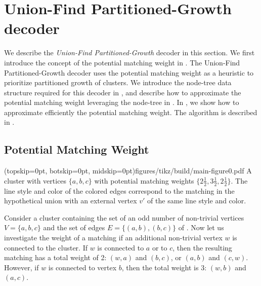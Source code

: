 \section{Union-Find Partitioned-Growth decoder}\label{sec:ufbb}
We describe the \emph{Union-Find Partitioned-Growth} decoder in this section. We first introduce the concept of the potential matching weight in . The Union-Find Partitioned-Growth decoder uses the potential matching weight as a heuristic to prioritize partitioned growth of clusters. We introduce the node-tree data structure required for this decoder in , and describe how to approximate the potential matching weight leveraging the node-tree in . In , we show how to approximate efficiently the potential matching weight. The algorithm is described in . 

\subsection{Potential Matching Weight}\label{sec:matchingweight}

\Figure[bt](topskip=0pt, botskip=0pt, midskip=0pt){figures/tikz/build/main-figure0.pdf}{
    A cluster with vertices $\{a,b,c\}$ with potential matching weights $\{2\frac{1}{2}, 3\frac{1}{2}, 2\frac{1}{2}\}$. The line style and color of the colored edges correspond to the matching in the hypothetical union with an external vertex $v'$ of the same line style and color.\label{fig0}}


Consider a cluster containing the set of an odd number of non-trivial vertices $V=\{a,b,c\}$ and the set of edges $E=\{(a,b), (b, c)\}$ of . Now let us investigate the weight of a matching if an additional non-trivial vertex $w$ is connected to the cluster. If $w$ is connected to $a$ or to $c$, then the resulting matching has a total weight of 2: $(w,a)$ and $(b,c)$, or $(a,b)$ and $(c,w)$. However, if $w$ is connected to vertex $b$, then the total weight is 3: $(w, b)$ and $(a, c)$. %

